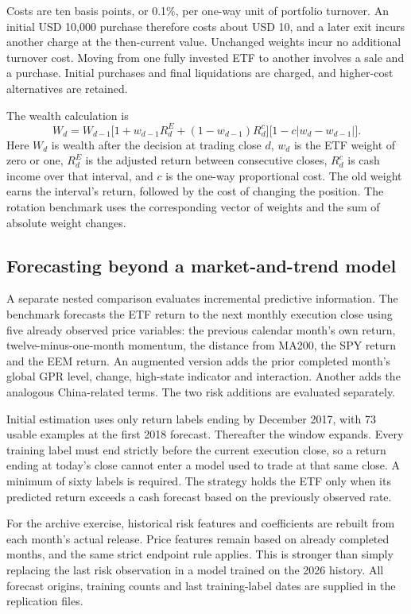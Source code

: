 Costs are ten basis points, or 0.1\%, per one-way unit of portfolio turnover. An initial USD 10,000 purchase therefore costs about USD 10, and a later exit incurs another charge at the then-current value. Unchanged weights incur no additional turnover cost. Moving from one fully invested ETF to another involves a sale and a purchase. Initial purchases and final liquidations are charged, and higher-cost alternatives are retained.

The wealth calculation is
\begin{equation}
W_d=W_{d-1}\bigl[1+w_{d-1}R^E_d+(1-w_{d-1})R^c_d\bigr]
                  \bigl[1-c|w_d-w_{d-1}|\bigr].
\label{eq:wealth}
\end{equation}
Here $W_d$ is wealth after the decision at trading close $d$, $w_d$ is the ETF weight of zero or one, $R^E_d$ is the adjusted return between consecutive closes, $R^c_d$ is cash income over that interval, and $c$ is the one-way proportional cost. The old weight earns the interval's return, followed by the cost of changing the position. The rotation benchmark uses the corresponding vector of weights and the sum of absolute weight changes.

\subsection{Forecasting beyond a market-and-trend model}

A separate nested comparison evaluates incremental predictive information. The benchmark forecasts the ETF return to the next monthly execution close using five already observed price variables: the previous calendar month's own return, twelve-minus-one-month momentum, the distance from MA200, the SPY return and the EEM return. An augmented version adds the prior completed month's global GPR level, change, high-state indicator and interaction. Another adds the analogous China-related terms. The two risk additions are evaluated separately.

Initial estimation uses only return labels ending by December 2017, with 73 usable examples at the first 2018 forecast. Thereafter the window expands. Every training label must end strictly before the current execution close, so a return ending at today's close cannot enter a model used to trade at that same close. A minimum of sixty labels is required. The strategy holds the ETF only when its predicted return exceeds a cash forecast based on the previously observed rate.

For the archive exercise, historical risk features and coefficients are rebuilt from each month's actual release. Price features remain based on already completed months, and the same strict endpoint rule applies. This is stronger than simply replacing the last risk observation in a model trained on the 2026 history. All forecast origins, training counts and last training-label dates are supplied in the replication files.

